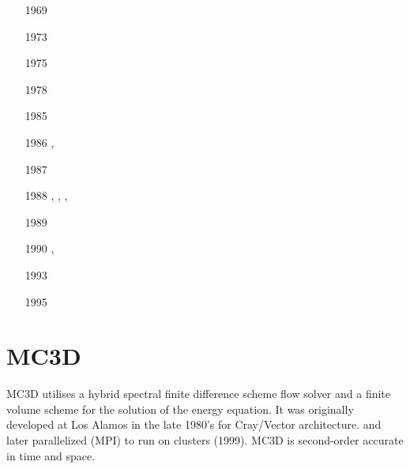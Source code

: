 \begin{small}
\begin{itemize}
\item[1969] \textcite{thll69} 
\item[1973] \textcite{thha73} 
\item[1975] \textcite{thom75} 
\item[1978] \textcite{dath78}
\item[1985] \textcite{scan85}
\item[1986] \textcite{gaas86}, \textcite{thsc86} 
\item[1987] \textcite{thsc87}
\item[1988] \textcite{elsc88}, \textcite{olsa88}, \textcite{thsc88},
            \textcite{thsq88}
\item[1989] \textcite{scoa89}
\item[1990] \textcite{thsq90}, \textcite{thsc90}
\item[1993] \textcite{olsa93}
\item[1995] \textcite{scag95}
\end{itemize}
\end{small} 




\section{MC3D}

MC3D utilises a hybrid spectral finite difference scheme flow
solver and a finite volume scheme for the solution of the energy equation.
It was originally developed at Los Alamos in the late 1980's for Cray/Vector architecture. 
and later parallelized (MPI) to run on clusters (1999).
MC3D is second-order accurate in time and space.

